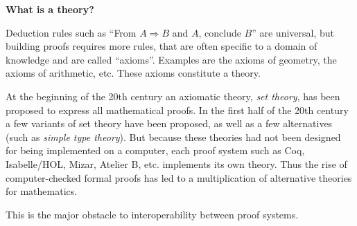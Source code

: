 \begin{framed}
\begin{center}
{\bf \Large What is a theory?}
\end{center}

Deduction rules such as ``From $A \Rightarrow B$ and $A$, conclude
$B$'' are universal, but building proofs requires more rules, that are
often specific to a domain of knowledge and are called
``axioms''. Examples are the axioms of geometry, the axioms of
arithmetic, etc. These axioms constitute a theory.

At the beginning of the 20th century an axiomatic theory, {\em set
  theory}, has been proposed to express all mathematical proofs. In
the first half of the 20th century a few variants of set theory have
been proposed, as well as a few alternatives (such as \emph{simple type theory}).
But because these theories had not been designed for being
implemented on a computer, each proof system such as Coq,
Isabelle/HOL, Mizar, Atelier B, etc. implements its own theory.
Thus the rise of computer-checked formal proofs has led to a
multiplication of alternative theories for mathematics.

This is the major obstacle to interoperability between proof systems.
\end{framed}

